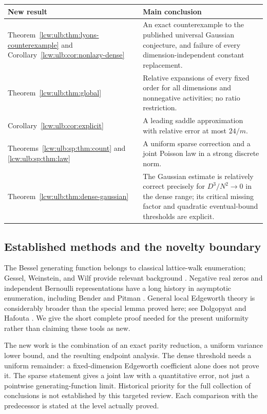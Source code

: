 \documentclass[11pt,letterpaper]{article}
\theoremstyle{remark}\newtheorem{remark}[theorem]{Remark}
\begin{document}
\begin{center}
\begin{tabular}{@{}p{}p{}@{}}
\toprule
New result & Main conclusion\\
\midrule
Theorem~\ref{lcw:ulb:thm:lyons-counterexample} and
Corollary~\ref{lcw:ulb:cor:nonlazy-dense}
& An exact counterexample to the published universal Gaussian
conjecture, and failure of every dimension-independent constant
replacement.\\[3pt]
Theorem~\ref{lcw:ulb:thm:global}
& Relative expansions of every fixed order for all dimensions and
nonnegative activities; no ratio restriction.\\[3pt]
Corollary~\ref{lcw:ulb:cor:explicit}
& A leading saddle approximation with relative error at most $24/m$.\\[3pt]
Theorems~\ref{lcw:ulb:sp:thm:count} and \ref{lcw:ulb:sp:thm:law}
& A uniform sparse correction and a joint Poisson law in a strong
discrete norm.\\[3pt]
Theorem~\ref{lcw:ulb:thm:dense-gaussian}
& The Gaussian estimate is relatively correct precisely for
$D^3/N^2\to0$ in the dense range; its critical missing factor and quadratic eventual-bound thresholds are explicit.\\
\bottomrule
\end{tabular}
\end{center}

\subsection{Established methods and the novelty boundary}

The Bessel generating function belongs to classical lattice-walk
enumeration; Gessel, Weinstein, and Wilf provide relevant background
\cite{gww}. Negative real zeros and independent Bernoulli representations
have a long history in asymptotic enumeration, including Bender and
Pitman \cite{bender,pitman}. General local Edgeworth theory is considerably
broader than the special lemma proved here; see Dolgopyat and Hafouta
\cite{dh}. We give the short complete proof needed for the present
uniformity rather than claiming these tools as new.

The new work is the combination of an exact parity reduction, a uniform
variance lower bound, and the resulting endpoint analysis. The dense
threshold needs a uniform remainder: a fixed-dimension Edgeworth
coefficient alone does not prove it. The sparse statement gives a joint
law with a quantitative error, not just a pointwise generating-function
limit. Historical priority for the full collection of conclusions is
not established by this targeted review. Each comparison with the
predecessor is stated at the level actually proved.
\end{document}
